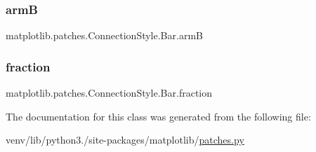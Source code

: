 \subsubsection{\texorpdfstring{armB}{armB}}
{\footnotesize\ttfamily matplotlib.\+patches.\+Connection\+Style.\+Bar.\+armB}

\mbox{\label{classmatplotlib_1_1patches_1_1ConnectionStyle_1_1Bar_a71fd92e92cb0bd171da926159deada1e}} 
\subsubsection{\texorpdfstring{fraction}{fraction}}
{\footnotesize\ttfamily matplotlib.\+patches.\+Connection\+Style.\+Bar.\+fraction}



The documentation for this class was generated from the following file\+:\begin{DoxyCompactItemize}
\item 
venv/lib/python3./site-\/packages/matplotlib/\hyperlink{patches_8py}{patches.\+py}\end{DoxyCompactItemize}
